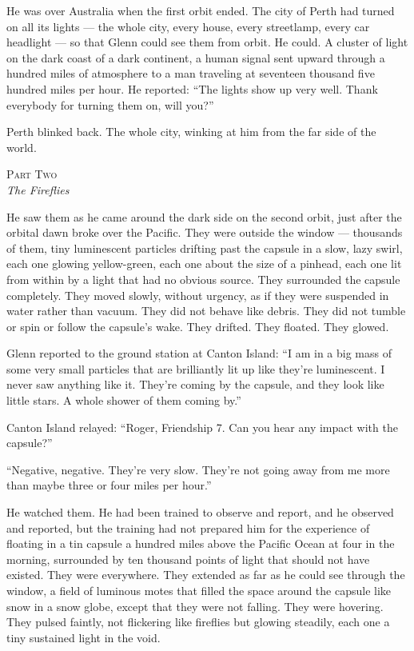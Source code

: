 \documentclass[12pt, letterpaper]{article}
\begin{document}
He was over Australia when the first orbit ended. The city of Perth had turned on all its lights --- the whole city, every house, every streetlamp, every car headlight --- so that Glenn could see them from orbit. He could. A cluster of light on the dark coast of a dark continent, a human signal sent upward through a hundred miles of atmosphere to a man traveling at seventeen thousand five hundred miles per hour. He reported: ``The lights show up very well. Thank everybody for turning them on, will you?''

Perth blinked back. The whole city, winking at him from the far side of the world.

\newpage

\begin{center}
{\small\textsc{Part Two}}\\[0.3em]
{\large\textit{The Fireflies}}
\end{center}

\vspace{1em}

\noindent He saw them as he came around the dark side on the second orbit, just after the orbital dawn broke over the Pacific. They were outside the window --- thousands of them, tiny luminescent particles drifting past the capsule in a slow, lazy swirl, each one glowing yellow-green, each one about the size of a pinhead, each one lit from within by a light that had no obvious source. They surrounded the capsule completely. They moved slowly, without urgency, as if they were suspended in water rather than vacuum. They did not behave like debris. They did not tumble or spin or follow the capsule's wake. They drifted. They floated. They glowed.

Glenn reported to the ground station at Canton Island: ``I am in a big mass of some very small particles that are brilliantly lit up like they're luminescent. I never saw anything like it. They're coming by the capsule, and they look like little stars. A whole shower of them coming by.''

Canton Island relayed: ``Roger, Friendship 7. Can you hear any impact with the capsule?''

``Negative, negative. They're very slow. They're not going away from me more than maybe three or four miles per hour.''

He watched them. He had been trained to observe and report, and he observed and reported, but the training had not prepared him for the experience of floating in a tin capsule a hundred miles above the Pacific Ocean at four in the morning, surrounded by ten thousand points of light that should not have existed. They were everywhere. They extended as far as he could see through the window, a field of luminous motes that filled the space around the capsule like snow in a snow globe, except that they were not falling. They were hovering. They pulsed faintly, not flickering like fireflies but glowing steadily, each one a tiny sustained light in the void.
\end{document}
